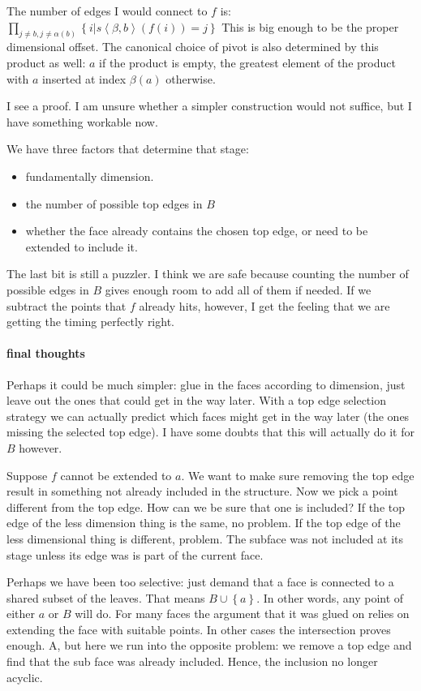 \documentclass{tac}
\newcommand\set[1]{\left\{#1\right\}}
\newcommand\tuplet[1]{\left\langle #1 \right\rangle}
\begin{document}
The number of edges I would connect to $f$ is:
$\prod_{j\neq b, j\neq \alpha(b)}\set{i|s\tuplet{\beta,b}(f(i)) = j}$
This is big enough to be the proper dimensional offset.
The canonical choice of pivot is also determined by this product as well: $a$ if the product is empty, the greatest element of the product with $a$ inserted at index $\beta(a)$ otherwise.

I see a proof. I am unsure whether a simpler construction would not suffice, but I have something workable now.

We have three factors that determine that stage:
\begin{itemize}
\item fundamentally dimension.
\item the number of possible top edges in $B$
\item whether the face already contains the chosen top edge, or need to be extended to include it.
\end{itemize}
The last bit is still a puzzler. I think we are safe because counting the number of possible edges in $B$ gives enough room to add all of them if needed. If we subtract the points that $f$ already hits, however, I get the feeling that we are getting the timing perfectly right.

\paragraph{final thoughts}
Perhaps it could be much simpler: glue in the faces according to dimension, just leave out the ones that could get in the way later. With a top edge selection strategy we can actually predict which faces might get in the way later (the ones missing the selected top edge). I have some doubts that this will actually do it for $B$ however.

Suppose $f$ cannot be extended to $a$. We want to make sure removing the top edge result in something not already included in the structure. 
Now we pick a point different from the top edge. How can we be sure that one is included? If the top edge of the less dimension thing is the same, no problem. If the top edge of the less dimensional thing is different, problem. The subface was not included at its stage unless its edge was is part of the current face.

Perhaps we have been too selective: just demand that a face is connected to a shared subset of the leaves. That means $B\cup\set{a}$. In other words, any point of either $a$ or $B$ will do. For many faces the argument that it was glued on relies on extending the face with suitable points. In other cases the intersection proves enough. A, but here we run into the opposite problem: we remove a top edge and find that the sub face was already included. Hence, the inclusion no longer acyclic.
\end{document}
